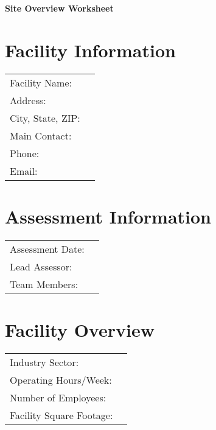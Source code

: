 \documentclass[./main.tex]{subfiles}
\begin{document}
\begin{center}
\Large\textbf{Site Overview Worksheet}
\end{center}

\section*{Facility Information}
\noindent\begin{tabularx}{\textwidth}{@{}lX@{}}
Facility Name: & \hrulefill \\[2ex]
Address: & \hrulefill \\[2ex]
City, State, ZIP: & \hrulefill \\[2ex]
Main Contact: & \hrulefill \\[2ex]
Phone: & \hrulefill \\[2ex]
Email: & \hrulefill \\[2ex]
\end{tabularx}

\section*{Assessment Information}
\noindent\begin{tabularx}{\textwidth}{@{}lX@{}}
Assessment Date: & \hrulefill \\[2ex]
Lead Assessor: & \hrulefill \\[2ex]
Team Members: & \hrulefill \\[2ex]
\end{tabularx}

\section*{Facility Overview}
\noindent\begin{tabularx}{\textwidth}{@{}lX@{}}
Industry Sector: & \hrulefill \\[2ex]
Operating Hours/Week: & \hrulefill \\[2ex]
Number of Employees: & \hrulefill \\[2ex]
Facility Square Footage: & \hrulefill \\[2ex]
\end{tabularx}

\newpage
\end{document}
